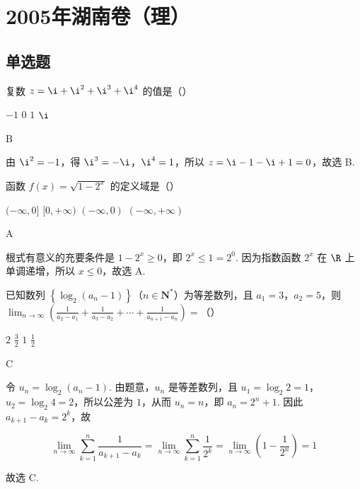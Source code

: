 \chapter{2005年湖南卷（理）}
\section{单选题}
\begin{problem}
复数 \(z = \i + \i^2 + \i^3 + \i^4\) 的值是（\quad）

\choices
    {\(-1\)}
    {\(0\)}
    {\(1\)}
    {\(\i\)}

\begin{answer}
B
\end{answer}

\begin{solution}
由 \(\i^2=-1\)，得 \(\i^3=-\i\)，\(\i^4=1\)，所以 \(z=\i-1-\i+1=0\)，故选 B.
\end{solution}
\end{problem}

\begin{problem}
函数 \(f(x) = \sqrt{1 - 2^x}\) 的定义域是（\quad）

\choices
    {\((-\infty, 0]\)}
    {\([0, +\infty)\)}
    {\((-\infty, 0)\)}
    {\((-\infty, +\infty)\)}

\begin{answer}
A
\end{answer}

\begin{solution}
根式有意义的充要条件是 \(1-2^x\geqslant0\)，即 \(2^x\leqslant1=2^0\). 因为指数函数 \(2^x\) 在 \(\R\) 上单调递增，所以 \(x\leqslant0\)，故选 A.
\end{solution}
\end{problem}

\begin{problem}
已知数列 \(\left\{\log_2(a_n - 1)\right\}\)（\(n \in \mathbf{N}^*\)）为等差数列，且 \(a_1 = 3\)，\(a_2 = 5\)，则 \(\displaystyle\lim_{n \to \infty} \left(\frac{1}{a_2 - a_1} + \frac{1}{a_3 - a_2} + \cdots + \frac{1}{a_{n+1} - a_n}\right) =\)（\quad）

\choices
    {\(2\)}
    {\(\frac{3}{2}\)}
    {\(1\)}
    {\(\frac{1}{2}\)}

\begin{answer}
C
\end{answer}

\begin{solution}
令 \(u_n=\log_2(a_n-1)\). 由题意，\(u_n\) 是等差数列，且 \(u_1=\log_2 2=1\)，\(u_2=\log_2 4=2\)，所以公差为 \(1\)，从而 \(u_n=n\)，即 \(a_n=2^n+1\). 因此 \(a_{k+1}-a_k=2^k\)，故

\[
\lim_{n\to\infty}\sum_{k=1}^{n}\frac{1}{a_{k+1}-a_k}=\lim_{n\to\infty}\sum_{k=1}^{n}\frac{1}{2^k}=\lim_{n\to\infty}\left(1-\frac{1}{2^n}\right)=1
\]

故选 C.
\end{solution}
\end{problem}

